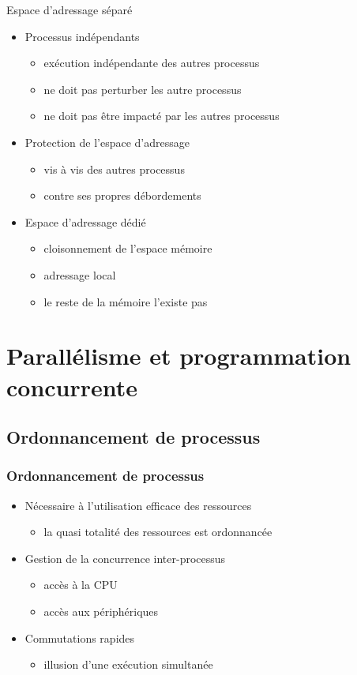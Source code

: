 \begin{frame}{Espace d’adressage séparé}
\begin{itemize}
\item Processus indépendants
\begin{itemize}
\item exécution indépendante des autres processus
\item ne doit pas perturber les autre processus
\item ne doit pas être impacté par les autres processus
\end{itemize}
\item Protection de l'espace d'adressage 
\begin{itemize}
\item vis à vis des autres processus
\item contre ses propres débordements
\end{itemize}

\item Espace d'adressage dédié 
\begin{itemize}
\item cloisonnement de l'espace mémoire
\item adressage local
\item le reste de la mémoire l'existe pas
\end{itemize}
\end{itemize}
\end{frame}


\section{Parallélisme et programmation concurrente}

\subsection{Ordonnancement de processus}

\begin{frame}
\frametitle{Ordonnancement de processus}
\begin{itemize}
\item Nécessaire à l’utilisation efficace des ressources
\begin{itemize}
\item la quasi totalité des ressources est ordonnancée
\end{itemize}
\item Gestion de la concurrence inter-processus
\begin{itemize}
\item accès à la CPU
\item accès aux périphériques
\end{itemize}
\item Commutations rapides
\begin{itemize}
\item illusion d’une exécution simultanée
\end{itemize}
\end{itemize}
\end{frame}


